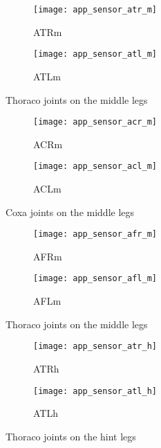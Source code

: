 \begin{figure}[H]
\centering
\begin{subfigure}{0.48\textwidth}
  \centering
  \texttt{[image: app\_sensor\_atr\_m]}
  \caption{ATRm}
  \label{fig:app_atr_m}
\end{subfigure}
\begin{subfigure}{0.48\textwidth}
  \centering
  \texttt{[image: app\_sensor\_atl\_m]}
  \caption{ATLm}
  \label{fig:app_atl_m}
\end{subfigure}
\caption{Thoraco joints on the middle legs}
\label{fig:app_at_m}
\end{figure}

\begin{figure}[H]
\centering
\begin{subfigure}{0.48\textwidth}
  \centering
  \texttt{[image: app\_sensor\_acr\_m]}
  \caption{ACRm}
  \label{fig:app_acr_m}
\end{subfigure}
\begin{subfigure}{0.48\textwidth}
  \centering
  \texttt{[image: app\_sensor\_acl\_m]}
  \caption{ACLm}
  \label{fig:app_acl_m}
\end{subfigure}
\caption{Coxa joints on the middle legs}
\label{fig:app_ac_m}
\end{figure}

\begin{figure}[H]
\centering
\begin{subfigure}{0.48\textwidth}
  \centering
  \texttt{[image: app\_sensor\_afr\_m]}
  \caption{AFRm}
  \label{fig:app_afr_m}
\end{subfigure}
\begin{subfigure}{0.48\textwidth}
  \centering
  \texttt{[image: app\_sensor\_afl\_m]}
  \caption{AFLm}
  \label{fig:app_afl_m}
\end{subfigure}
\caption{Thoraco joints on the middle legs}
\label{fig:app_af_m}
\end{figure}

\begin{figure}[H]
\centering
\begin{subfigure}{0.48\textwidth}
  \centering
  \texttt{[image: app\_sensor\_atr\_h]}
  \caption{ATRh}
  \label{fig:app_atr_h}
\end{subfigure}
\begin{subfigure}{0.48\textwidth}
  \centering
  \texttt{[image: app\_sensor\_atl\_h]}
  \caption{ATLh}
  \label{fig:app_atl_h}
\end{subfigure}
\caption{Thoraco joints on the hint legs}
\label{fig:app_at_h}
\end{figure}

